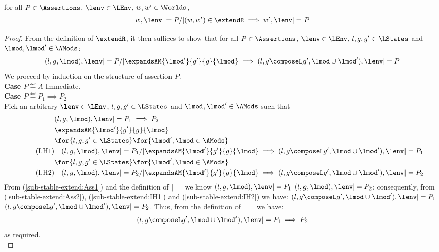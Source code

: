 %
\begin{lemma}[]\label{lem:sub-stable-extend}
for all $P \in \Assertions$, $\lenv \in \LEnv$, $w, w' \in \Worlds$, 
% 
\[
\begin{array}{@{} l @{}}
	w, \lenv |= P /| (w, w') \in \extendR 
	\implies  w', \lenv |= P
\end{array}
\]
%
\begin{proof}
From the definition of $\extendR$, it then suffices to show that for all $P \in \Assertions$, $\lenv \in \LEnv$, $l, g, g' \in \LStates$ and $\lmod, \lmod' \in \AMods$: 
% 
\[
\begin{array}{@{} l @{}}
	(l, g, \lmod), \lenv |= P /| 
	\expandsAM{\lmod'}{g'}{g}{\lmod}
	 \implies  (l, g \composeL g', \lmod \cup \lmod'), \lenv |= P
\end{array}
\]
%
We proceed by induction on the structure of assertion $P$.	\\

\noindent\textbf{Case $P \eqdef A$\quad} Immediate.\\
\noindent\textbf{Case $P \eqdef P_1 \implies P_2$} \\
Pick an arbitrary $\lenv \in \LEnv$, $l, g, g' \in \LStates$ and $\lmod, \lmod' \in \AMods$ such that
%
\begin{align}
	& (l, g, \lmod), \lenv |= P_1 \implies P_2 \label{sub-stable-extend:Ass1}\\
%	
	&\expandsAM{\lmod'}{g'}{g}{\lmod} \label{sub-stable-extend:Ass2}\\
%	
	& \for{l, g, g' \in \LStates} \for{\lmod', \lmod\in \AMods} \nonumber\\
	\tag{I.H1} & 
	\quad (l, g, \lmod), \lenv |= P_1 /| \expandsAM{\lmod'}{g'}{g}{\lmod} \implies (l, g \composeL g', \lmod \cup \lmod'), \lenv |= P_1 \label{sub-stable-extend:IH1}\\ 
%
	& \for{l, g, g' \in \LStates} \for{\lmod', \lmod \in \AMods} \nonumber\\
	\tag{I.H2} & 
	\quad (l, g, \lmod), \lenv |= P_2 /| \expandsAM{\lmod'}{g'}{g}{\lmod} \implies (l, g \composeL g', \lmod \cup \lmod'), \lenv |= P_2 \label{sub-stable-extend:IH2}
%	
\end{align}
%
From (\ref{sub-stable-extend:Ass1}) and the definition of $|=$ we know $(l, g, \lmod), \lenv |= P_1$  $(l, g, \lmod), \lenv |= P_2$; consequently, from (\ref{sub-stable-extend:Ass2}), (\ref{sub-stable-extend:IH1}) and (\ref{sub-stable-extend:IH2}) we have: $(l, g \composeL g', \lmod \cup \lmod'), \lenv |= P_1$  $(l, g \composeL g', \lmod \cup \lmod'), \lenv |= P_2$. Thus, from the definition of $|=$ we have:
%
\begin{align*}
	(l, g \composeL g', \lmod \cup \lmod'), \lenv |= P_1 \implies P_2
\end{align*}
%
as required.\\


\end{proof}
\end{lemma}

